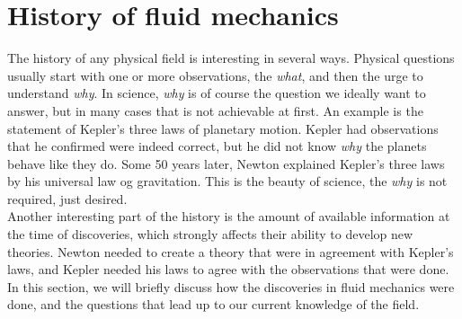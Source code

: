 \section{History of fluid mechanics}
The history of any physical field is interesting in several ways. Physical questions usually start with one or more observations, the \textit{what}, and then the urge to understand \textit{why}. In science, \textit{why} is of course the question we ideally want to answer, but in many cases that is not achievable at first. An example is the statement of Kepler's three laws of planetary motion. Kepler had observations that he confirmed were indeed correct, but he did not know \textit{why} the planets behave like they do. Some 50 years later, Newton explained Kepler's three laws by his universal law og gravitation. This is the beauty of science, the \textit{why} is not required, just desired.\\
Another interesting part of the history is the amount of available information at the time of discoveries, which strongly affects their ability to develop new theories. Newton needed to create a theory that were in agreement with Kepler's laws, and Kepler needed his laws to agree with the observations that were done.\\
In this section, we will briefly discuss how the discoveries in fluid mechanics were done, and the questions that lead up to our current knowledge of the field. 

